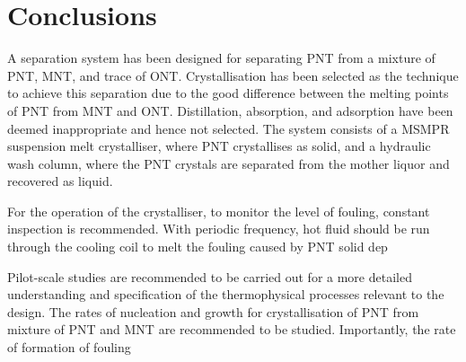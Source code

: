 \section{Conclusions}\label{separation conclusions}

A separation system has been designed for separating PNT from a mixture of PNT, MNT, and trace of ONT. Crystallisation has been selected as the technique to achieve this separation due to the good difference between the melting points of PNT from MNT and ONT. Distillation, absorption, and adsorption have been deemed inappropriate and hence not selected. The system consists of a MSMPR suspension melt crystalliser, where PNT crystallises as solid, and a hydraulic wash column, where the PNT crystals are separated from the mother liquor and recovered as liquid. 

For the operation of the crystalliser, to monitor the level of fouling, constant inspection is recommended. With periodic frequency, hot fluid should be run through the cooling coil to melt the fouling caused by PNT solid dep

Pilot-scale studies are recommended to be carried out for a more detailed understanding and specification of the thermophysical processes relevant to the design. The rates of nucleation and growth for crystallisation of PNT from mixture of PNT and MNT are recommended to be studied. Importantly, the rate of formation of fouling 